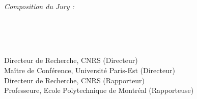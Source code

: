 \begin{titlepage}
\begin{addmargin}[-1cm]{-3cm}
\begin{center}
\textit{Composition du Jury :}

\medskip


\begin{adjustwidth*}{-0.5cm}{-2cm}
\begin{minipage}{0.28\linewidth}
\raggedright
\textbf{}\\
\textbf{}\\
\textbf{}\\
\textbf{}
\end{minipage}
\begin{minipage}{0.7\linewidth}
\raggedright
Directeur de Recherche, CNRS (Directeur)\\
Maître de Conférence, Université Paris-Est (Directeur)\\
Directeur de Recherche, CNRS (Rapporteur)\\
Professeure, Ecole Polytechnique de Montréal (Rapporteuse)
\end{minipage}
\end{adjustwidth*}

\vfill

\end{center}
\end{addmargin}

\end{titlepage}





